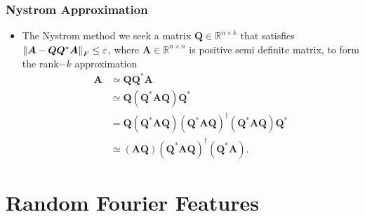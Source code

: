 \documentclass[9pt,hyperref={pdfpagelabels=false},xcolor=table]{beamer}
\begin{document}
\begin{frame}
    \frametitle{Nystrom Approximation}
    \begin{itemize}
        \item The Nystrom method we seek a matrix $\bm{Q}\in \mathbb{R}^{n \times k}$ that satisfies $\left\lVert\bm{A} - \bm{Q} \bm{Q}^{\ast} \bm{A}\right\rVert_{F} \leq \varepsilon$, where $\bm{A} \in \mathbb{R}^{n \times n}$ is positive semi definite matrix, to form the rank$-k$ approximation
              \begin{align*}
                  \bm{A} & \simeq \bm{Q} \bm{Q}^{\ast} \bm{A}                                                                                                                                \\
                         & \simeq \bm{Q} \left( \bm{Q}^{\ast} \bm{A} \bm{Q} \right) \bm{Q}^{\ast}                                                                                            \\
                         & = \bm{Q} \left( \bm{Q}^{\ast} \bm{A} \bm{Q} \right) \left( \bm{Q}^{\ast} \bm{A} \bm{Q} \right)^{\dagger} \left( \bm{Q}^{\ast} \bm{A} \bm{Q} \right) \bm{Q}^{\ast} \\
                         & \simeq \left( \bm{A} \bm{Q} \right) \left( \bm{Q}^{\ast} \bm{A} \bm{Q} \right)^{\dagger} \left( \bm{Q}^{\ast} \bm{A} \right).
              \end{align*}
    \end{itemize}
\end{frame}

\section{Random Fourier Features}
\end{document}
